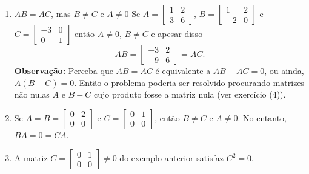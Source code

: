 \documentclass[12pt,a4paper]{article}
\begin{document}
\begin{enumerate}
\begin{enumerate}
\item $AB =AC$, mas $B \neq C$ e $A \neq 0$
Se $A =
\begin{bmatrix}
1 & 2 \\
3 & 6
\end{bmatrix}$,
$B =
\begin{bmatrix}
 1 & 2 \\
-2 & 0
\end{bmatrix}$
e
$C =
\begin{bmatrix}
-3 & 0 \\
0 & 1
\end{bmatrix}$
então $A \neq 0$, $B \neq C$ e apesar disso
\[
A B =
\begin{bmatrix}
-3 & 2 \\
-9 & 6
\end{bmatrix}
= A C.
\]
\textbf{Observação:} Perceba que $AB = AC$ é equivalente a $AB - AC = 0$, ou ainda, $A(B-C) = 0$. Então o problema poderia ser resolvido procurando matrizes não nulas $A$ e $B-C$ cujo produto fosse a matriz nula (ver exercício (4)).

\item Se $A = B =
\begin{bmatrix}
0 & 2 \\
0 & 0
\end{bmatrix}$
e
$C =
\begin{bmatrix}
0 & 1 \\
0 & 0
\end{bmatrix}$,
então $B \neq C$ e $A \neq 0$. No entanto, $BA = 0 = CA$.


\item A matriz $C =
\begin{bmatrix}
0 & 1 \\
0 & 0
\end{bmatrix} \neq 0$
do exemplo anterior satisfaz $C^2=0$.
\end{enumerate}





\end{enumerate}
\end{document}

